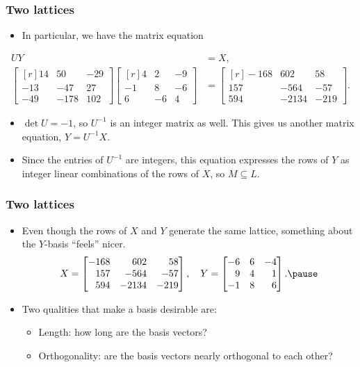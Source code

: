 \documentclass{beamer}
\begin{document}
\begin{frame}
	\frametitle{Two lattices}
	\begin{itemize}
		\item In particular, we have the matrix equation\\
	\end{itemize}
	\begin{align*}
	UY&= X,\\
	\begin{bmatrix*}[r]
		14 & 50 & -29\\
		-13 & -47 & 27\\
		-49 & -178 & 102
	\end{bmatrix*}
	\begin{bmatrix*}[r]
		4 & 2 & -9\\
		-1 & 8 & -6\\
		6 & -6 & 4
	\end{bmatrix*}&=
	\begin{bmatrix*}[r]
		-168 & 602 & 58\\
		157 & -564 & -57\\
		594 & -2134 & -219
	\end{bmatrix*}.
	\end{align*}\pause

	\begin{itemize}
		\item $\det U = -1$, so $U^{-1}$ is an integer matrix as well. This gives us another matrix equation, $Y = U^{-1}X$.\pause
		\item Since the entries of $U^{-1}$ are integers, this equation expresses the rows of $Y$ as integer linear combinations of the rows of $X$, so $M\subseteq L$.
	\end{itemize}
\end{frame}

\begin{frame}
	\frametitle{Two lattices}
	\begin{itemize}
		\item Even though the rows of $X$ and $Y$ generate the same lattice, something about the $Y$-basis ``feels'' nicer.
		\[
		X = \begin{bmatrix*}[r]
			-168 & 602 & 58\\
			157 & -564 & -57\\
			594 & -2134 & -219\\
		\end{bmatrix*}, \quad
		Y = \begin{bmatrix*}[r]
			-6 & 6 & -4\\
			9 & 4 & 1\\
			-1 & 8 & 6\\
		\end{bmatrix*}.\pause
		\]
		\item Two qualities that make a basis desirable are:
		\begin{itemize}
			\item Length: how long are the basis vectors?
			\item Orthogonality: are the basis vectors nearly orthogonal to each other?
		\end{itemize}
	\end{itemize}
\end{frame}
\end{document}
